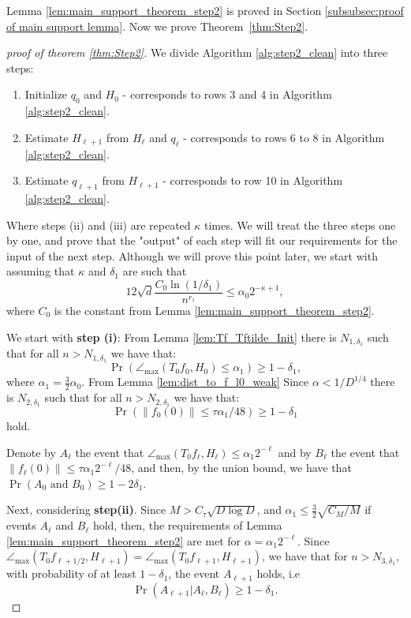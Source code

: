 \documentclass[12pt]{article}
\theoremstyle{remark}
\newcommand{\maxangle}{\angle_{\max}}
\begin{document}
Lemma \ref{lem:main_support_theorem_step2} is proved in Section \ref{subsubsec:proof of main support lemma}.
Now we prove Theorem~\ref{thm:Step2}.
\begin{proof}[proof of theorem \ref{thm:Step2}]
We divide Algorithm \ref{alg:step2_clean} into three steps:
\begin{enumerate}
    \item[(i)] Initialize $q_0$ and $H_0$ - corresponds to rows 3 and 4 in Algorithm \ref{alg:step2_clean}.
    \item[(ii)] Estimate $H_{\ell+1}$ from $H_{\ell}$ and $q_\ell$ - corresponds to rows 6 to 8 in Algorithm \ref{alg:step2_clean}.
    \item[(iii)] Estimate $q_{\ell+1}$ from $H_{\ell+1}$ - corresponds to row 10 in Algorithm \ref{alg:step2_clean}.
\end{enumerate}
Where steps (ii) and (iii) are repeated $\kappa$ times.
We will treat the three steps one by one, and prove that the "output" of each step will fit our requirements for the input of the next step. Although we will prove this point later, we start with assuming that $\kappa$ and $\delta_1$ are such that 
\begin{equation}\label{eq:n_bound1}
    12\sqrt{d}\frac{C_0 \ln(1/\delta_1)}{n^{r_1}} \leq \alpha_0 2^{-\kappa+1},
\end{equation}
where $C_0$ is the constant from Lemma \ref{lem:main_support_theorem_step2}. 

We start with \textbf{step (i)}: From Lemma \ref{lem:Tf_Tftilde_Init} there is $N_{1,\delta_1}$ such that for all $n>N_{1,\delta_1}$ we have that:
\[
\Pr\left(\maxangle (T_0f_{0}, H_{0}) \leq \alpha_1 \right) \geq 1-\delta_1,
\]
where $\alpha_1 = \frac{3}{2} \alpha_0$.
From Lemma \ref{lem:dist_to_f_l0_weak} Since $\alpha <1/D^{1/4}$ there is $N_{2,\delta_1}$ such that for all $n>N_{2,\delta_1}$ we have that:
\[
\Pr\left(\|f_0(0)\| \leq \tau \alpha_1 /48\right) \geq 1-\delta_1
\]
hold.

Denote by $A_\ell$ the event that $\maxangle (T_0f_{\ell}, H_{\ell}) \leq \alpha_1 2^{-\ell}$ and by $B_\ell$ the event that $\|f_\ell(0)\| \leq \tau \alpha_1 2^{-\ell} /48$, and then, by the union bound, we have that $\Pr(A_0 \mbox{ and } B_0) \geq 1-2\delta_1$.

Next, considering \textbf{step(ii)}. Since $M>C_\tau \sqrt{D\log D}$, and $\alpha_1 \leq \frac{3}{2} \sqrt{ C_M/M}$ if events $A_\ell$ and $B_\ell$ hold, then, the requirements of Lemma \ref{lem:main_support_theorem_step2} are met for $\alpha = \alpha_1 2^{-\ell}$. Since $\maxangle (T_0f_{\ell+1/2}, H_{\ell+1}) =\maxangle (T_0f_{\ell+1}, H_{\ell+1}) $, we have that for $n> N_{3,\delta_1}$, with probability of at least $1-\delta_1$, the event $A_{\ell+1}$ holds, i.e 
\[
\Pr(A_{\ell+1}|A_\ell, B_\ell) \geq 1-\delta_1.
\]


\end{proof}
\end{document}
